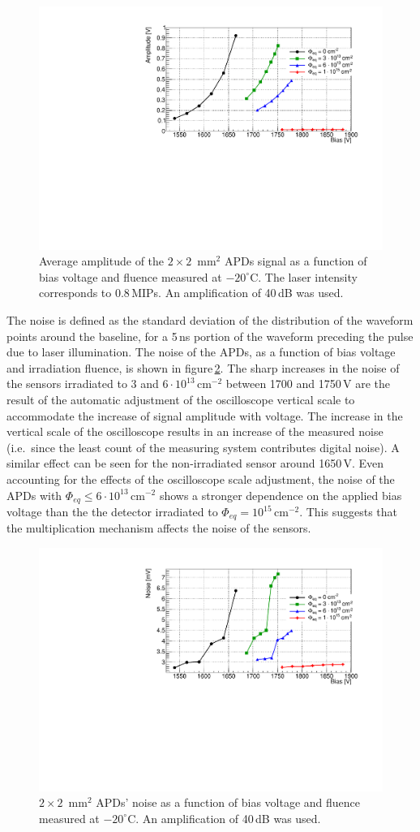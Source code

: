 \documentclass[review,number,sort&compress]{elsarticle}
\begin{document}
\begin{figure}
  \centering
  \includegraphics[width = 0.6 \columnwidth]{ampli2x2APDs}
  \caption{Average amplitude of the $2 \times 2$~mm$^2$ APDs signal as a function of bias voltage and fluence measured at $-20^\circ$C. The laser intensity corresponds to 0.8\,MIPs. An amplification of 40\,dB was used.}
  \label{fig:ampli2x2}
\end{figure}

The noise is defined as the standard deviation of the distribution of the waveform points around the baseline, for a 5\,ns portion of the waveform preceding the pulse due to laser illumination.
The noise of the APDs, as a function of bias voltage and irradiation fluence, is shown in figure\,\ref{fig:noise2x2}.
The sharp increases in the noise of the sensors irradiated to $3$ and $6 \cdot 10^{13}$\,cm$^{-2}$ between 1700 and 1750\,V are the result of the automatic adjustment of the oscilloscope vertical scale to accommodate the increase of signal amplitude with voltage.
The increase in the vertical scale of the oscilloscope results in an increase of the measured noise (i.e.\ since the least count of the measuring system contributes digital noise).
A similar effect can be seen for the non-irradiated sensor around 1650\,V.
Even accounting for the effects of the oscilloscope scale adjustment, the noise of the APDs with $\Phi_{eq} \leq 6 \cdot 10^{13}$\,cm$^{-2}$ shows a stronger dependence on the applied bias voltage than the the detector irradiated to $\Phi_{eq} = 10^{15}$\,cm$^{-2}$.
This suggests that the multiplication mechanism affects the noise of the sensors.

\begin{figure}
  \centering
  \includegraphics[width = 0.6 \columnwidth]{noise2x2APDs}
  \caption{$2 \times 2$~mm$^2$ APDs' noise as a function of bias voltage and fluence measured at $-20^\circ$C. An amplification of 40\,dB was used.}
  \label{fig:noise2x2}
\end{figure}
\end{document}
